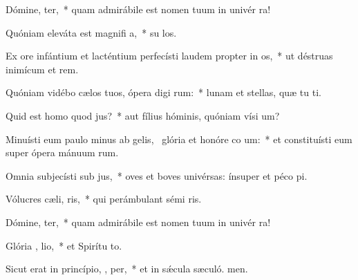 \item Dómine,  ter,~* quam admirábile est nomen tuum in univér ra!
\item Quóniam eleváta est magnifi a,~* su los.
\item Ex ore infántium et lacténtium perfecísti laudem propter in os,~* ut déstruas inimícum et rem.
\item Quóniam vidébo cælos tuos, ópera digi rum:~* lunam et stellas, quæ tu ti.
\item Quid est homo quod   jus?~* aut fílius hóminis, quóniam vísi um?
\item Minuísti eum paulo minus ab gelis,~\pscross{} glória et honóre co um:~* et constituísti eum super ópera mánuum rum.
\item Omnia subjecísti sub  jus,~* oves et boves univérsas: ínsuper et péco pi.
\item Vólucres cæli,   ris,~* qui perámbulant sémi ris.
\item Dómine,  ter,~* quam admirábile est nomen tuum in univér ra!
\item Glória ,  lio,~* et Spirítu to.
\item Sicut erat in princípio,  ,  per,~* et in sǽcula sæculó. men.
